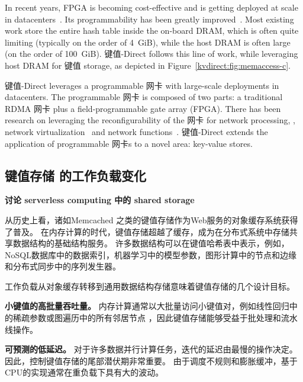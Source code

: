 {In recent years, FPGA is becoming cost-effective and is getting deployed at scale in datacenters~\cite{putnam2014programmable, caulfield2016cloud}. Its programmability has been greatly improved~\cite{li2016clicknp}.
Most existing work store the entire hash table inside the on-board DRAM, which is often quite limiting (typically on the order of 4~GiB), while the host DRAM is often large (on the order of 100~GiB).
键值-Direct follows this line of work, while leveraging host DRAM for 键值 storage, as depicted in Figure~\ref{kvdirect:fig:memaccess-c}.

键值-Direct leverages a programmable 网卡 with large-scale deployments in datacenters.
The programmable 网卡 is composed of two parts: a traditional RDMA 网卡 plus a field-programmable gate array (FPGA).
There has been research on leveraging the reconfigurability of the 网卡 for network processing, \eg, network virtualization~\cite{greenberg2015sdn, vfp} and network functions~\cite{li2016clicknp}.
键值-Direct extends the application of programmable 网卡s to a novel area: key-value stores.
}

\subsection{键值存储 的工作负载变化}
\label{kvdirect:sec:workload-shift}

\textbf{讨论 serverless computing 中的 shared storage}

从历史上看，诸如Memcached \cite {fitzpatrick2004distributed}之类的键值存储作为Web服务的对象缓存系统获得了普及。
在内存计算的时代，键值存储超越了缓存，成为在分布式系统中存储共享数据结构的基础结构服务。
许多数据结构可以在键值哈希表中表示，例如，NoSQL数据库中的数据索引\cite {chang2008bigtable}，机器学习中的模型参数\cite {li2014scaling}，图形计算中的节点和边缘\cite {shao2013trinity,xiao17tux2}和分布式同步中的序列发生器\cite {kalia2016design,eris}。

工作负载从对象缓存转移到通用数据结构存储意味着键值存储的几个设计目标。

\textbf {小键值的高批量吞吐量。}
内存计算通常以大批量访问小键值对，例如线性回归中的稀疏参数\cite {li2014algorithmic,xiao17tux2}或图遍历中的所有邻居节点 \cite {shao2013trinity}，因此键值存储能够受益于批处理和流水线操作。

\textbf {可预测的低延迟。}
对于许多数据并行计算任务，迭代的延迟由最慢的操作决定\cite {ousterhout2015ramcloud}。 因此，控制键值存储的尾部潜伏期非常重要。 由于调度不规则和膨胀缓冲，基于CPU的实现通常在重负载下具有大的波动。

